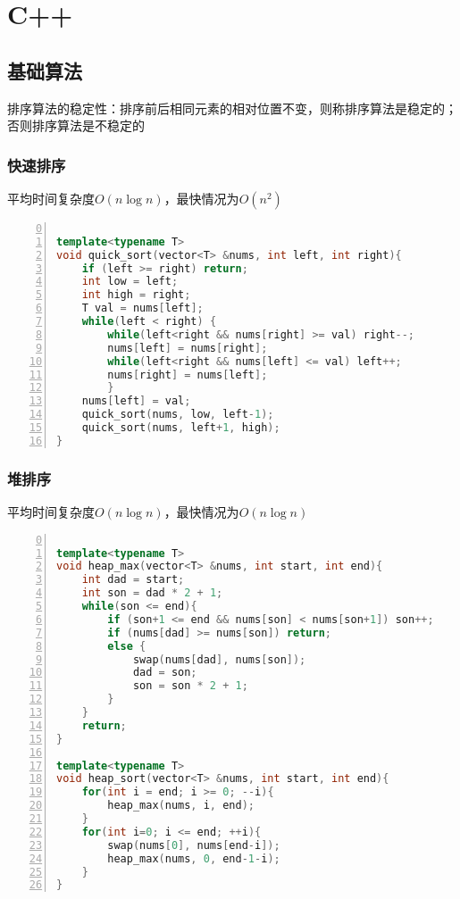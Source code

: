 \chapter{C++}
\section{基础算法}
排序算法的稳定性：排序前后相同元素的相对位置不变，则称排序算法是稳定的；否则排序算法是不稳定的
\subsection{快速排序}
平均时间复杂度$O(n\log n)$，最快情况为$O(n^2)$

\begin{lstlisting}[language=c++,numbers=left,firstnumber = 0,numberstyle=\tiny,breaklines = true,keywordstyle=\color{blue!70},commentstyle=\color{red!50!green!50!blue!50},frame=shadowbox, rulesepcolor=\color{red!20!green!20!blue!20}]
	
template<typename T>
void quick_sort(vector<T> &nums, int left, int right){
    if (left >= right) return;
    int low = left;
    int high = right;
    T val = nums[left];
    while(left < right) {
        while(left<right && nums[right] >= val) right--;
        nums[left] = nums[right];
        while(left<right && nums[left] <= val) left++;
        nums[right] = nums[left];
        }
    nums[left] = val;
    quick_sort(nums, low, left-1);
    quick_sort(nums, left+1, high); 
}
\end{lstlisting}

\subsection{堆排序}
平均时间复杂度$O(n\log n)$，最快情况为$O(n\log n)$

\begin{lstlisting}[language=c++,numbers=left,firstnumber = 0,numberstyle=\tiny,breaklines = true,keywordstyle=\color{blue!70},commentstyle=\color{red!50!green!50!blue!50},frame=shadowbox, rulesepcolor=\color{red!20!green!20!blue!20}]

template<typename T>
void heap_max(vector<T> &nums, int start, int end){
    int dad = start;
    int son = dad * 2 + 1;
    while(son <= end){
        if (son+1 <= end && nums[son] < nums[son+1]) son++;
        if (nums[dad] >= nums[son]) return;
        else {
            swap(nums[dad], nums[son]);
            dad = son;
            son = son * 2 + 1;
        }
    }
    return;
}

template<typename T>
void heap_sort(vector<T> &nums, int start, int end){
    for(int i = end; i >= 0; --i){
        heap_max(nums, i, end);
    }
    for(int i=0; i <= end; ++i){
        swap(nums[0], nums[end-i]);
        heap_max(nums, 0, end-1-i);
    }
}

\end{lstlisting}


